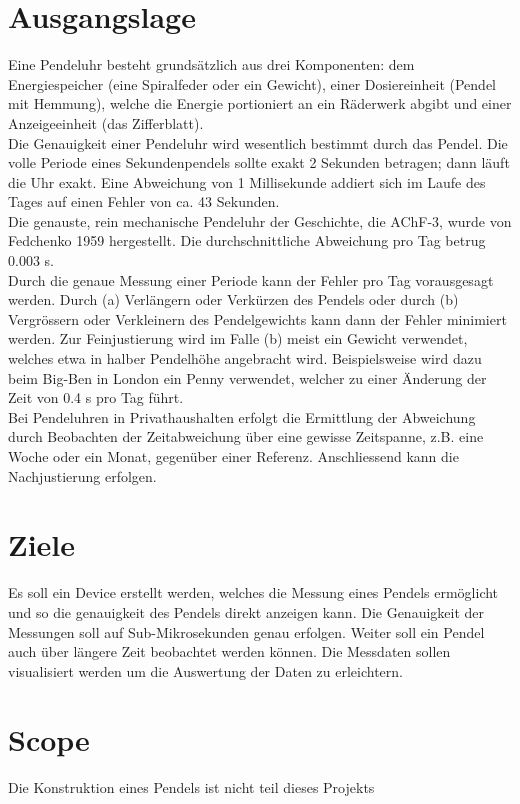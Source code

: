 \section{Ausgangslage}
Eine Pendeluhr besteht grundsätzlich aus drei Komponenten: dem Energiespeicher (eine Spiralfeder
oder ein Gewicht), einer Dosiereinheit (Pendel mit Hemmung), welche die Energie portioniert an ein
Räderwerk abgibt und einer Anzeigeeinheit (das Zifferblatt).\\
Die Genauigkeit einer Pendeluhr wird wesentlich bestimmt durch das Pendel. Die volle Periode eines Sekundenpendels sollte exakt 2 Sekunden betragen; dann läuft die Uhr exakt. Eine Abweichung von 1 Millisekunde addiert sich im Laufe des Tages auf einen Fehler von ca. 43 Sekunden.\\
Die genauste, rein mechanische Pendeluhr der Geschichte, die AChF-3, wurde von Fedchenko 1959
hergestellt. Die durchschnittliche Abweichung pro Tag betrug 0.003 s.\\
Durch die genaue Messung einer Periode kann der Fehler pro Tag vorausgesagt werden. Durch (a)
Verlängern oder Verkürzen des Pendels oder durch (b) Vergrössern oder Verkleinern des
Pendelgewichts kann dann der Fehler minimiert werden. Zur Feinjustierung wird im Falle (b) meist ein
Gewicht verwendet, welches etwa in halber Pendelhöhe angebracht wird. Beispielsweise wird dazu
beim Big-Ben in London ein \glqq{}Penny\grqq{} verwendet, welcher zu einer Änderung der Zeit von 0.4 s pro Tag führt.\\
Bei Pendeluhren in Privathaushalten erfolgt die Ermittlung der Abweichung durch Beobachten der Zeitabweichung über eine gewisse Zeitspanne, z.B. eine Woche oder ein Monat, gegenüber einer Referenz. Anschliessend kann die Nachjustierung erfolgen. 

\section{Ziele}
Es soll ein Device erstellt werden, welches die Messung eines Pendels ermöglicht und so die genauigkeit des Pendels direkt anzeigen kann.
Die Genauigkeit der Messungen soll auf Sub-Mikrosekunden genau erfolgen.
Weiter soll ein Pendel auch über längere Zeit beobachtet werden können.
Die Messdaten sollen visualisiert werden um die Auswertung der Daten zu erleichtern.

\section{Scope}
Die Konstruktion eines Pendels ist nicht teil dieses Projekts

